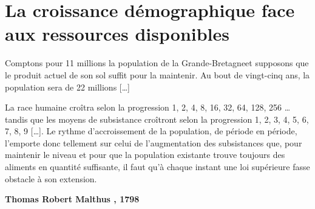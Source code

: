 \documentclass[oneside,12pt]{article}          %
\begin{document}

\vfill
{}




\section{La croissance démographique face aux ressources disponibles}

\begin{tcolorbox}[
    enhanced , arc = 0pt , top = 4mm ,
    colback = white ,
    fonttitle = \bfseries , title = {Document \no 2 : Extrait de \og Essai sur le principe de population \fg} , boxed title style = {arc = 0pt} ,
    coltitle = black , colbacktitle = black!10 ,
    attach boxed title to top left = {xshift = 5mm , yshift = -4mm} ,
	]	

	{\ttfamily\itshape\restoreskip
	
	Comptons pour 11 millions la population de la Grande-Bretagne\footnotemark[3] et supposons que le produit actuel de son sol suffit pour la maintenir. Au bout de vingt-cinq ans, la population sera de 22 millions [\ldots]
	
	La race humaine croîtra selon la progression 1, 2, 4, 8, 16, 32, 64, 128, 256 \ldots tandis que les moyens de subsistance croîtront selon la progression 1, 2, 3, 4, 5, 6, 7, 8, 9 [\ldots]. Le rythme d’accroissement de la population, de période en période, l’emporte donc tellement sur celui de l’augmentation des subsistances que, pour maintenir le niveau et pour que la population existante trouve toujours des aliments en quantité suffisante, il faut qu’à chaque instant une loi supérieure fasse obstacle à son extension. 

	}
	\begin{flushright}
	    \textbf{Thomas Robert Malthus , 1798}
	\end{flushright}
\end{tcolorbox}
\end{document}
